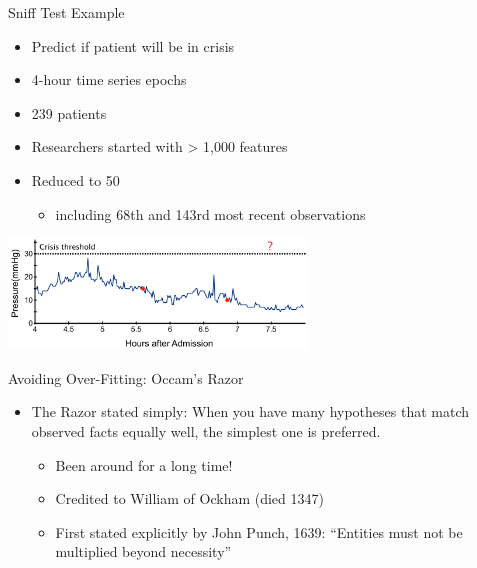 \documentclass[aspectratio=169]{beamer}
\begin{document}
\begin{frame}{Sniff Test Example}

\begin{itemize}
\item Predict if patient will be in crisis
\item 4-hour time series epochs
\item 239 patients
\item Researchers started with > 1,000 features
\item Reduced to 50
	\begin{itemize}
	\item including 68th and 143rd most recent observations
	\end{itemize}
\end{itemize}
    	{\includegraphics[height=8em]{./lectReg/2102forGuizaOverfit.pdf}} 
%
%
\end{frame}
	
\begin{frame}{Avoiding Over-Fitting: Occam's Razor}

\begin{itemize}
\item The Razor stated simply: When you have many hypotheses that match observed facts equally well, the simplest one is preferred.
	\begin{itemize}
	\item Been around for a long time!
	\item Credited to William of Ockham (died 1347)
	\item First stated explicitly by John Punch, 1639: ``Entities must not be multiplied beyond necessity''
	\end{itemize}

\end{itemize}
\end{frame}
\end{document}
